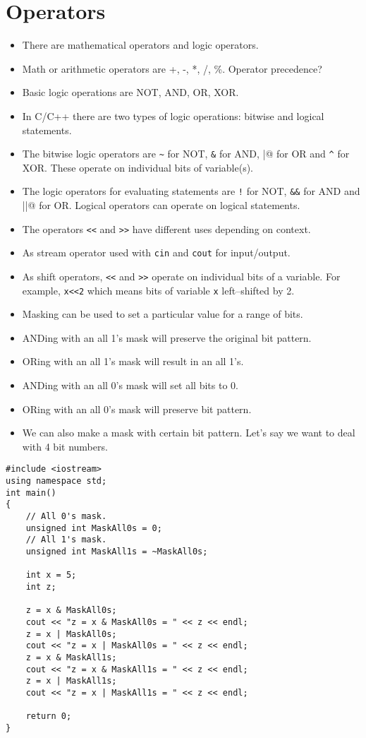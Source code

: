 \documentclass[12pt,a4paper]{article}
\begin{document}
\section{Operators}
\begin{itemize}
\item There are mathematical operators and logic operators.
\item Math or arithmetic operators are +, -, *, /, \%. Operator precedence?
\item Basic logic operations are NOT, AND, OR, XOR.
\item In C/C++ there are two types of logic operations: bitwise and logical statements.
\item The bitwise logic operators are \verb|~| for NOT, \verb|&| for AND, \verb@|@ for OR and \verb|^| for XOR. These operate on individual bits of variable(s).
\item The logic operators for evaluating statements are \verb|!| for NOT, \verb|&&| for AND and \verb@||@ for OR. Logical operators can operate on logical statements.
\item The operators \verb|<<| and \verb|>>| have different uses depending on context.
\item As stream operator used with \verb|cin| and \verb|cout| for input/output.
\item As shift operators, \verb|<<| and \verb|>>| operate on individual bits of a variable. For example, \verb|x<<2| which means bits of variable \verb|x| left--shifted by 2.
\end{itemize}
\begin{itemize}
\item Masking can be used to set a particular value for a range of bits.
\item ANDing with an all 1's mask will preserve the original bit pattern.
\item ORing with an all 1's mask will result in an all 1's.
\item ANDing with an all 0's mask will set all bits to 0.
\item ORing with an all 0's mask will preserve bit pattern.
\item We can also make a mask with certain bit pattern. Let's say we want to deal with 4 bit numbers.
\end{itemize}
\begin{lstlisting}[caption={Example: Masking}]
#include <iostream> 
using namespace std; 
int main()
{
	// All 0's mask.
	unsigned int MaskAll0s = 0;
	// All 1's mask.
	unsigned int MaskAll1s = ~MaskAll0s;
	
	int x = 5;
	int z;
	
	z = x & MaskAll0s;
	cout << "z = x & MaskAll0s = " << z << endl;
	z = x | MaskAll0s;
	cout << "z = x | MaskAll0s = " << z << endl;
	z = x & MaskAll1s;
	cout << "z = x & MaskAll1s = " << z << endl;
	z = x | MaskAll1s;
	cout << "z = x | MaskAll1s = " << z << endl;

	return 0;
}
\end{lstlisting}
\end{document}
